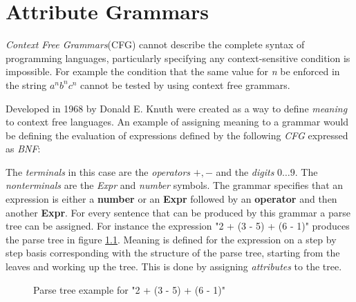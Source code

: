 \chapter{Attribute Grammars}
\emph{Context Free Grammars}(CFG) cannot describe the complete syntax of programming languages\cite{knuth1}, particularly specifying any context-sensitive condition is impossible. For example the condition that the same value for \emph{n} be enforced in the string $a^nb^nc^n$ cannot be tested by using context free grammars\cite{ken}.

Developed in 1968 by Donald E. Knuth \ags were created as a way to define \emph{meaning} to context free languages. An example of assigning meaning to a grammar would be defining the evaluation of expressions defined by the following \emph{CFG} expressed as \emph{BNF}:



The \emph{terminals} in this case are the \emph{operators} $+,-$ and the \emph{digits} $0\ldots 9$. The \emph{nonterminals} are the \emph{Expr} and \emph{number} symbols. The grammar specifies that an expression is either a \textbf{number} or an \textbf{Expr} followed by an \textbf{operator} and then another \textbf{Expr}. For every sentence that can be produced by this grammar a parse tree can be assigned. For instance the expression "2 + (3 - 5) + (6 - 1)" produces the parse tree in figure \ref{fig.example1.parsetree}. Meaning is defined for the expression on a step by step basis corresponding with the structure of the parse tree, starting from the leaves and working up the tree. This is done by assigning \emph{attributes} to the tree.

\begin{figure}[H]
\centering
{}
\caption{Parse tree example for "2 + (3 - 5) + (6 - 1)"}
\label{fig.example1.parsetree}
\end{figure}

